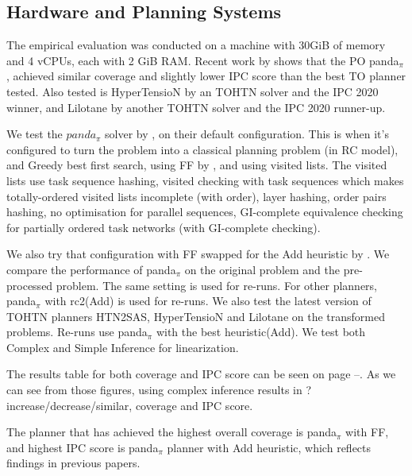 \documentclass[letterpaper]{article} %
\begin{document}
\subsection{Hardware and Planning Systems}
The empirical evaluation was conducted on a machine with 30GiB of memory and 4 vCPUs, each with 2 GiB RAM. Recent work by \cite{HTN2SAS} shows that the PO panda$_\pi$, achieved similar coverage and slightly lower IPC score than the best TO planner tested. Also tested is HyperTensioN by \cite{hypertension} an TOHTN solver and the IPC 2020 winner, and Lilotane by \cite{Lilotane} another TOHTN solver and the IPC 2020 runner-up. 

We test the $panda_{\pi}$ solver by \cite{useClassicalHuristicICAPS18,useClassicalHeuristicIJCAI19,progressionsearchJAIR20}, on their default configuration. This is when it's configured to turn the problem into a classical planning problem (in RC model), and Greedy best first search, using FF by \cite{FF}, and using visited lists. The visited lists use task sequence hashing, visited checking with task sequences which makes totally-ordered visited lists incomplete (with order), layer hashing, order pairs hashing, no optimisation for parallel sequences,  GI-complete equivalence checking for
partially ordered task networks (with GI-complete checking).


We also try that configuration with FF swapped for the Add heuristic by \cite{Add}.
We compare the performance of panda$_\pi$ on the original problem and the pre-processed problem. The same setting is used for re-runs. For other planners, panda$_\pi$ with rc2(Add) is used for re-runs. We also test the latest version of TOHTN planners HTN2SAS, HyperTensioN and Lilotane on the transformed problems. Re-runs use panda$_{\pi}$ with the best heuristic(Add). 
We test both Complex and Simple Inference for linearization.

The results table for both coverage and IPC score can be seen on page \pageref{table:GroundedSimpleIPC}--\pageref{table:GroundedComplexIPC}.
As we can see from those figures, using complex inference results in ?  increase/decrease/similar, coverage and IPC score.

The planner that has achieved the highest overall coverage is panda$_\pi$ with FF, and highest IPC score is panda$_\pi$ planner with Add heuristic, which reflects findings in previous papers.
\end{document}
